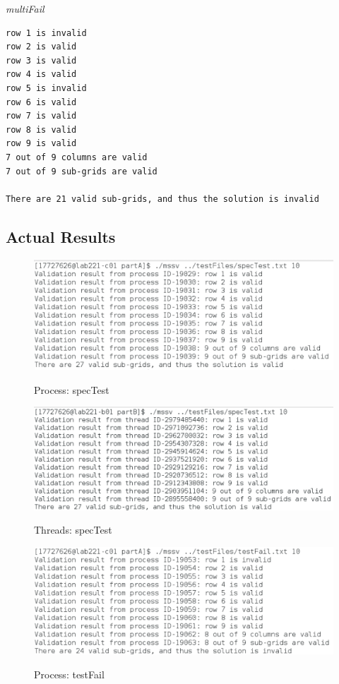 \documentclass[]{article}
\begin{document}
\vspace{1cm}
\textit{multiFail}
\begin{lstlisting}
row 1 is invalid
row 2 is valid
row 3 is valid
row 4 is valid
row 5 is invalid
row 6 is valid
row 7 is valid
row 8 is valid
row 9 is valid
7 out of 9 columns are valid
7 out of 9 sub-grids are valid

There are 21 valid sub-grids, and thus the solution is invalid
\end{lstlisting}
\subsection{Actual Results}


	\begin{figure}[H]
	\caption{Process: specTest}
	\begin{center}
		{
			\includegraphics[height=0.25\textheight,width=1.0
			\textwidth]{Pro_spec.png}}
	\end{center}
	\end{figure}
	
	
	\begin{figure}[H]
	\caption{Threads: specTest}		
		\begin{center}
			{
				\includegraphics[height=0.25\textheight,width=1.0
				\textwidth]{Thr_spec.png}}
		\end{center}
	\end{figure}

	\begin{figure}[H]
	\caption{Process: testFail}
	\begin{center}
		{
			\includegraphics[height=0.25\textheight,width=1.0
			\textwidth]{Pro_testF.png}}
	\end{center}
	\end{figure}
\end{document}
